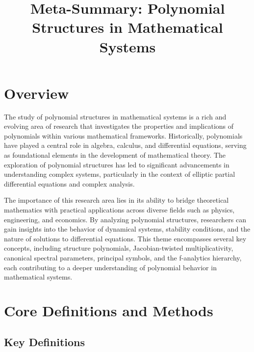 \documentclass[11pt,a4paper]{article}
\title{Meta-Summary: Polynomial Structures in Mathematical Systems}
\date{}
\begin{document}
\maketitle

\section{Overview}

The study of polynomial structures in mathematical systems is a rich and evolving area of research that investigates the properties and implications of polynomials within various mathematical frameworks. Historically, polynomials have played a central role in algebra, calculus, and differential equations, serving as foundational elements in the development of mathematical theory. The exploration of polynomial structures has led to significant advancements in understanding complex systems, particularly in the context of elliptic partial differential equations and complex analysis.

The importance of this research area lies in its ability to bridge theoretical mathematics with practical applications across diverse fields such as physics, engineering, and economics. By analyzing polynomial structures, researchers can gain insights into the behavior of dynamical systems, stability conditions, and the nature of solutions to differential equations. This theme encompasses several key concepts, including structure polynomials, Jacobian-twisted multiplicativity, canonical spectral parameters, principal symbols, and the f-analytics hierarchy, each contributing to a deeper understanding of polynomial behavior in mathematical systems.

\section{Core Definitions and Methods}

\subsection{Key Definitions}
\end{document}
